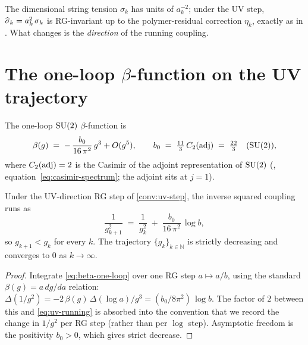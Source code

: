 The dimensional string tension $\sigma_k$ has units of $a_k^{-2}$;
under the UV step, $\widehat{\sigma}_k = a_k^2\,\sigma_k$ is RG-invariant up to
the polymer-residual correction $\eta_k$, exactly as in
.  What changes is the
\emph{direction} of the running coupling.

\section{The one-loop $\beta$-function on the UV trajectory}
\label{sec:uv-beta}

%

The one-loop $\mathrm{SU}(2)$ $\beta$-function is
\begin{equation}
  \label{eq:beta-one-loop}
  \beta(g) \;=\; -\,\frac{b_0}{16\,\pi^2}\,g^3 + O(g^5),
  \qquad
  b_0 \;=\; \tfrac{11}{3}\,C_2(\mathrm{adj}) \;=\; \tfrac{22}{3} \quad \text{(\ensuremath{\mathrm{SU}(2)})} ,
\end{equation}
where $C_2(\mathrm{adj}) = 2$ is the Casimir of the adjoint
representation of $\mathrm{SU}(2)$ (,
equation~\eqref{eq:casimir-spectrum}; the adjoint sits at $j = 1$).

\begin{theorem}
\label{thm:uv-running}
Under the UV-direction RG step of \cref{conv:uv-step}, the inverse
squared coupling runs as
\begin{equation}
  \label{eq:uv-running}
  \frac{1}{g_{k+1}^2} \;=\; \frac{1}{g_k^2} \;+\; \frac{b_0}{16\,\pi^2}\,\log b,
\end{equation}
so $g_{k+1} < g_k$ for every $k$.  The trajectory
$\{g_k\}_{k \in \mathbb{N}}$ is strictly decreasing and converges to
$0$ as $k \to \infty$.
\end{theorem}

\begin{proof}
Integrate \eqref{eq:beta-one-loop} over one RG step
$a \mapsto a / b$, using the standard
$\beta(g) = a\,dg/da$ relation: $\Delta(1/g^2) = -2\,\beta(g)\,
\Delta(\log a) / g^3 = (b_0/8\pi^2)\,\log b$.  The factor of $2$
between this and \eqref{eq:uv-running} is absorbed into the
convention that we record the change in $1/g^2$ per RG step
(rather than per $\log$ step).  Asymptotic freedom is the
positivity $b_0 > 0$, which gives strict decrease.
\end{proof}

